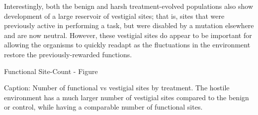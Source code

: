 Interestingly, both the benign and harsh treatment-evolved populations also show development of a large reservoir of vestigial sites; that is, sites that were previously active in performing a task, but were disabled by a mutation elsewhere and are now neutral.  However, these vestigial sites do appear to be important for allowing the organisms to quickly readapt as the fluctuations in the environment restore the previously-rewarded functions.

Functional Site-Count - Figure

Caption: Number of functional vs vestigial sites by treatment. The hostile environment has a much larger number of vestigial sites compared to the benign or control, while having a comparable number of functional sites.

